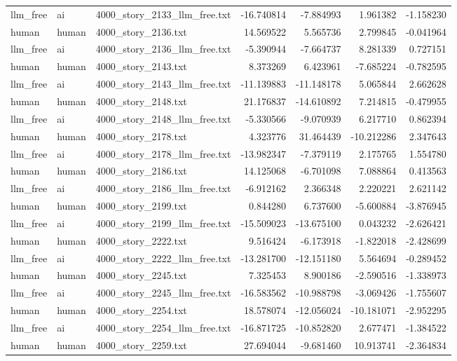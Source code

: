 \begin{longtable}{lllrrrr}
llm\_free & ai & 4000\_story\_2133\_llm\_free.txt & -16.740814 & -7.884993 & 1.961382 & -1.158230 \\
human & human & 4000\_story\_2136.txt & 14.569522 & 5.565736 & 2.799845 & -0.041964 \\
llm\_free & ai & 4000\_story\_2136\_llm\_free.txt & -5.390944 & -7.664737 & 8.281339 & 0.727151 \\
human & human & 4000\_story\_2143.txt & 8.373269 & 6.423961 & -7.685224 & -0.782595 \\
llm\_free & ai & 4000\_story\_2143\_llm\_free.txt & -11.139883 & -11.148178 & 5.065844 & 2.662628 \\
human & human & 4000\_story\_2148.txt & 21.176837 & -14.610892 & 7.214815 & -0.479955 \\
llm\_free & ai & 4000\_story\_2148\_llm\_free.txt & -5.330566 & -9.070939 & 6.217710 & 0.862394 \\
human & human & 4000\_story\_2178.txt & 4.323776 & 31.464439 & -10.212286 & 2.347643 \\
llm\_free & ai & 4000\_story\_2178\_llm\_free.txt & -13.982347 & -7.379119 & 2.175765 & 1.554780 \\
human & human & 4000\_story\_2186.txt & 14.125068 & -6.701098 & 7.088864 & 0.413563 \\
llm\_free & ai & 4000\_story\_2186\_llm\_free.txt & -6.912162 & 2.366348 & 2.220221 & 2.621142 \\
human & human & 4000\_story\_2199.txt & 0.844280 & 6.737600 & -5.600884 & -3.876945 \\
llm\_free & ai & 4000\_story\_2199\_llm\_free.txt & -15.509023 & -13.675100 & 0.043232 & -2.626421 \\
human & human & 4000\_story\_2222.txt & 9.516424 & -6.173918 & -1.822018 & -2.428699 \\
llm\_free & ai & 4000\_story\_2222\_llm\_free.txt & -13.281700 & -12.151180 & 5.564694 & -0.289452 \\
human & human & 4000\_story\_2245.txt & 7.325453 & 8.900186 & -2.590516 & -1.338973 \\
llm\_free & ai & 4000\_story\_2245\_llm\_free.txt & -16.583562 & -10.988798 & -3.069426 & -1.755607 \\
human & human & 4000\_story\_2254.txt & 18.578074 & -12.056024 & -10.181071 & -2.952295 \\
llm\_free & ai & 4000\_story\_2254\_llm\_free.txt & -16.871725 & -10.852820 & 2.677471 & -1.384522 \\
human & human & 4000\_story\_2259.txt & 27.694044 & -9.681460 & 10.913741 & -2.364834 \\

\end{longtable}
